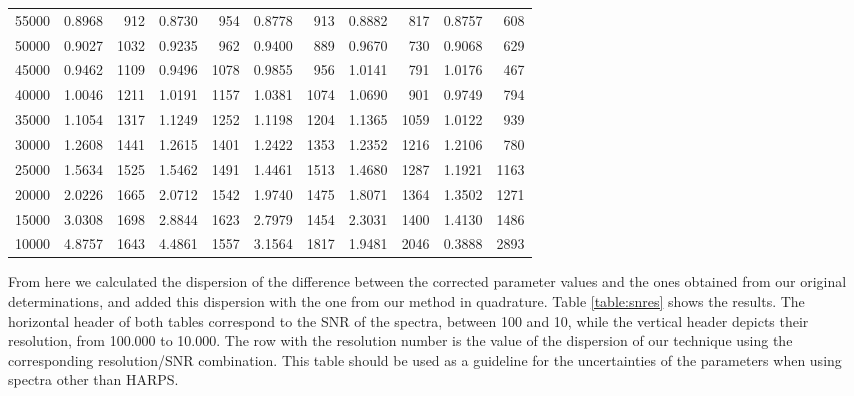 \documentclass{aa}
\begin{document}
\begin{table}[]
\begin{center}
{{\begin{tabular}{l r r r r r r r r r r}
55000 & 0.8968 & 912 & 0.8730 & 954 & 0.8778 & 913 & 0.8882 & 817 & 0.8757 & 608 \\
50000 & 0.9027 & 1032 & 0.9235 & 962 & 0.9400 & 889 & 0.9670 & 730 & 0.9068 & 629 \\
45000 & 0.9462 & 1109 & 0.9496 & 1078 & 0.9855 & 956 & 1.0141 & 791 & 1.0176 & 467 \\
40000 & 1.0046 & 1211 & 1.0191 & 1157 & 1.0381 & 1074 & 1.0690 & 901 & 0.9749 & 794 \\
35000 & 1.1054 & 1317 & 1.1249 & 1252 & 1.1198 & 1204 & 1.1365 & 1059 & 1.0122 & 939 \\
30000 & 1.2608 & 1441 & 1.2615 & 1401 & 1.2422 & 1353 & 1.2352 & 1216 & 1.2106 & 780 \\
25000 & 1.5634 & 1525 & 1.5462 & 1491 & 1.4461 & 1513 & 1.4680 & 1287 & 1.1921 & 1163 \\
20000 & 2.0226 & 1665 & 2.0712 & 1542 & 1.9740 & 1475 & 1.8071 & 1364 & 1.3502 & 1271 \\
15000 & 3.0308 & 1698 & 2.8844 & 1623 & 2.7979 & 1454 & 2.3031 & 1400 & 1.4130 & 1486 \\
10000 & 4.8757 & 1643 & 4.4861 & 1557 & 3.1564 & 1817 & 1.9481 & 2046 & 0.3888 & 2893 \\
\hline
\end{tabular}
}}
\end{center}
\end{table}

From here we calculated the dispersion of the difference between the corrected parameter values and the ones obtained from our original determinations, and added this dispersion with the one from our method in quadrature. Table \ref{table:snres} shows the results. The horizontal header of both tables correspond to the SNR of the spectra, between 100 and 10,  while the vertical header depicts their resolution, from 100.000 to 10.000. The row with the resolution number is the value of the dispersion of our technique using the corresponding resolution/SNR combination. This table should be used as a guideline for the uncertainties of the parameters when using spectra other than HARPS.
\end{document}
